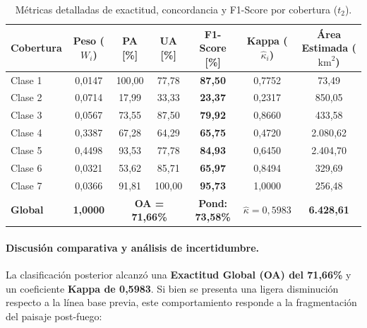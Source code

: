 \documentclass[12pt]{article}
\begin{document}
\begin{table}[H]
    \centering
    \caption{Métricas detalladas de exactitud, concordancia y F1-Score por cobertura ($t_2$).}
    \label{tab:metricas_after_clases}
    \small
    \begin{tabular}{@{}lcccccc@{}}
        \toprule
        \textbf{Cobertura} & \textbf{Peso ($W_i$)} & \textbf{PA [\%]} & \textbf{UA [\%]} & \textbf{F1-Score [\%]} & \textbf{Kappa ($\hat{\kappa}_i$)} & \textbf{Área Estimada ($\text{km}^2$)} \\
        \midrule
        Clase 1 & 0{,}0147 & 100{,}00 & 77{,}78 & \textbf{87{,}50} & 0{,}7752 & 73{,}49 \\
        Clase 2 & 0{,}0714 & 17{,}99 & 33{,}33 & \textbf{23{,}37} & 0{,}2317 & 850{,}05 \\
        Clase 3 & 0{,}0567 & 73{,}55 & 87{,}50 & \textbf{79{,}92} & 0{,}8660 & 433{,}58 \\
        Clase 4 & 0{,}3387 & 67{,}28 & 64{,}29 & \textbf{65{,}75} & 0{,}4720 & 2.080{,}62 \\
        Clase 5 & 0{,}4498 & 93{,}53 & 77{,}78 & \textbf{84{,}93} & 0{,}6450 & 2.404{,}70 \\
        Clase 6 & 0{,}0321 & 53{,}62 & 85{,}71 & \textbf{65{,}97} & 0{,}8494 & 329{,}69 \\
        Clase 7 & 0{,}0366 & 91{,}81 & 100{,}00 & \textbf{95{,}73} & 1{,}0000 & 256{,}48 \\
        \midrule
        \textbf{Global} & \textbf{1{,}0000} & \multicolumn{2}{c}{\textbf{OA = 71{,}66\%}} & \textbf{Pond: 73{,}58\%} & \textbf{$\hat{\kappa} = 0{,}5983$} & \textbf{6.428{,}61} \\
        \bottomrule
    \end{tabular}
\end{table}

\paragraph{Discusión comparativa y análisis de incertidumbre.}
La clasificación posterior alcanzó una \textbf{Exactitud Global (OA) del 71,66\%} y un coeficiente \textbf{Kappa de 0,5983}. Si bien se presenta una ligera disminución respecto a la línea base previa, este comportamiento responde a la fragmentación del paisaje post-fuego:
\end{document}
